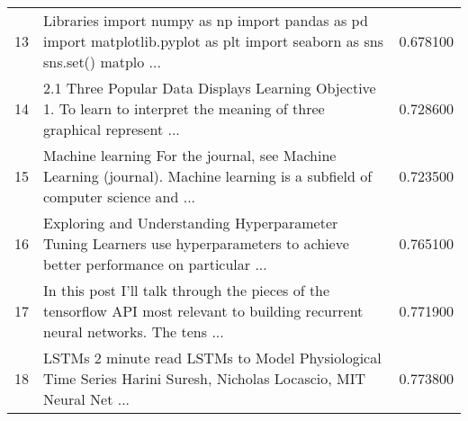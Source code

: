\begin{table}[htbp]
\begin{tabular}{|c|p{12cm}|c|}
13 &  Libraries  import numpy as np import pandas as pd import matplotlib.pyplot as plt import seaborn as sns  sns.set()  matplo ... & 0.678100 \\
14 &  2.1 Three Popular Data Displays   Learning Objective  1. To learn to interpret the meaning of three graphical represent ... & 0.728600 \\
15 &  Machine learning  For the journal, see Machine Learning (journal).  Machine learning is a subfield of computer science and  ... & 0.723500 \\
16 &  Exploring and Understanding Hyperparameter Tuning  Learners use hyperparameters to achieve better performance on particular ... & 0.765100 \\
17 & In this post I’ll talk through the pieces of the tensorflow API most relevant to building recurrent neural networks. The tens ... & 0.771900 \\
18 &  LSTMs  2 minute read     LSTMs to Model Physiological Time Series  Harini Suresh, Nicholas Locascio, MIT   Neural Net ... & 0.773800 \\
\bottomrule
\end{tabular}
\end{table}
